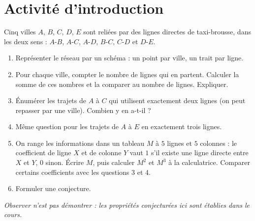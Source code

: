 \mxnewpage
\section{Activité d'introduction}
\begin{activity}
Cinq villes $A$, $B$, $C$, $D$, $E$ sont reliées par des lignes directes de taxi-brousse, dans les deux sens : $A$-$B$, $A$-$C$, $A$-$D$, $B$-$C$, $C$-$D$ et $D$-$E$.
\begin{enumerate}
\item Représenter le réseau par un schéma : un point par ville, un trait par ligne.
\item Pour chaque ville, compter le nombre de lignes qui en partent. Calculer la somme de ces nombres et la comparer au nombre de lignes. Expliquer.
\item Énumérer les trajets de $A$ à $C$ qui utilisent exactement deux lignes (on peut repasser par une ville). Combien y en a-t-il ?
\item Même question pour les trajets de $A$ à $E$ en exactement trois lignes.
\item On range les informations dans un tableau $M$ à $5$ lignes et $5$ colonnes : le coefficient de ligne $X$ et de colonne $Y$ vaut $1$ s'il existe une ligne directe entre $X$ et $Y$, $0$ sinon. Écrire $M$, puis calculer $M^2$ et $M^3$ à la calculatrice. Comparer certains coefficients avec les questions 3 et 4.
\item Formuler une conjecture.
\end{enumerate}
\par\emph{Observer n'est pas démontrer : les propriétés conjecturées ici sont établies dans le cours.}
\end{activity}
